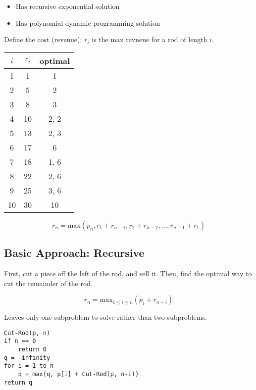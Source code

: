 \documentclass{article}
\begin{document}
\begin{itemize}
    \item Has recursive exponential solution
    \item Has polynomial dynamic programming solution
\end{itemize}

Define the cost (revenue): \(r_i\) is the max revneue for a rod of length \(i\).

\begin{tabular}{ccc}
    $i$ & \(r_i\) & optimal \\
    \hline
    1   & 1       & 1       \\
    2   & 5       & 2       \\
    3   & 8       & 3       \\
    4   & 10      & 2, 2    \\
    5   & 13      & 2, 3    \\
    6   & 17      & 6       \\
    7   & 18      & 1, 6    \\
    8   & 22      & 2, 6    \\
    9   & 25      & 3, 6    \\
    10  & 30      & 10      \\
\end{tabular}

\begin{equation*}
    r_n = \text{max}(p_n, r_1 + r_{n-1}, r_2 + r_{n-2}, \ldots, r_{n-1} + r_1)
\end{equation*}

\subsection*{Basic Approach: Recursive}

First, cut a piece off the left of the rod, and sell it.
Then, find the optimal way to cut the remainder of the rod.

\begin{equation*}
    r_n = \text{max}_{1 \leq i \leq n} (p_i + r_{n-i})
\end{equation*}

Leaves only one subproblem to solve rather than two subproblems.

\begin{verbatim}
Cut-Rod(p, n)
if n == 0
    return 0
q = -infinity
for i = 1 to n
    q = max(q, p[i] + Cut-Rod(p, n-i))
return q
\end{verbatim}
\end{document}
